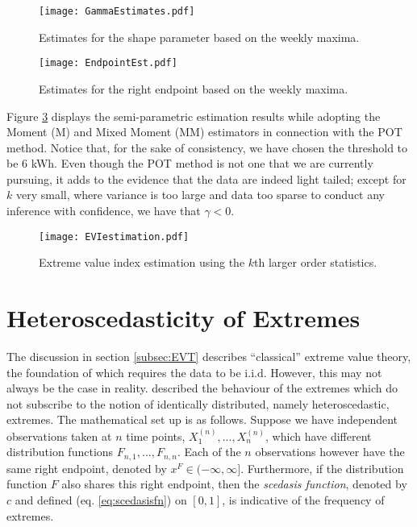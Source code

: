\begin{figure}
\begin{center}
\texttt{[image: GammaEstimates.pdf]}
\caption{Estimates for the shape parameter based on the weekly maxima.} \label{fig:gammaEst}
\end{center}
\end{figure}

\begin{figure}
\begin{center}
\texttt{[image: EndpointEst.pdf]}
\caption{Estimates for the right endpoint based on the weekly maxima.} \label{fig:EndPointEst}
\end{center}
\end{figure}

Figure \ref{fig:POTEst} displays the semi-parametric estimation results while adopting the Moment (M) and Mixed Moment (MM) estimators in connection with the POT method. Notice that, for the sake of consistency, we have chosen the threshold to be 6 kWh. Even though the POT method is not one that we are currently pursuing, it adds to the evidence that the data are indeed light tailed; except for $k$ very small, where variance is too large and data too sparse to conduct any inference with confidence, we have that $\gamma < 0$.

\begin{figure}
\begin{center}
\texttt{[image: EVIestimation.pdf]}
\caption{Extreme value index estimation using the $k$th larger order statistics.} \label{fig:POTEst}
\end{center}
\end{figure}

\section{Heteroscedasticity of Extremes} \label{subsec:sced}

The discussion in section \ref{subsec:EVT} describes ``classical'' extreme value theory, the foundation of which requires the data to be i.i.d. However, this may not always be the case in reality. \cite{einmahl16} described the behaviour of the extremes which do not subscribe to the notion of identically distributed, namely heteroscedastic, extremes. The mathematical set up is as follows. Suppose we have independent observations taken at $n$ time points, $X_1^{(n)} , ... , X_n^{(n)}$, which have different distribution functions $F_{n,1}, ... , F_{n,n}$. Each of the $n$ observations however have the same right endpoint, denoted by $x^F \in (-\infty, \infty]$. Furthermore, if the distribution function $F$ also shares this right endpoint, then the \textit{scedasis function}, denoted by $c$ and defined (eq. \ref{eq:scedasisfn}) on $[0,1]$, is indicative of the frequency of extremes.

